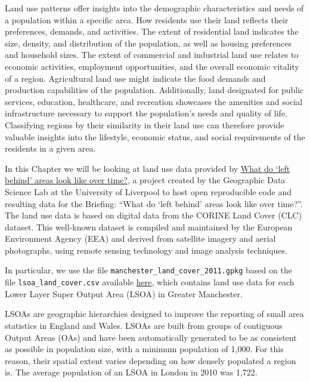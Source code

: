 \documentclass[
  letterpaper,
  DIV=11,
  numbers=noendperiod]{scrreprt}
\begin{document}
Land use patterns offer insights into the demographic characteristics
and needs of a population within a specific area. How residents use
their land reflects their preferences, demands, and activities. The
extent of residential land indicates the size, density, and distribution
of the population, as well as housing preferences and household sizes.
The extent of commercial and industrial land use relates to economic
activities, employment opportunities, and the overall economic vitality
of a region. Agricultural land use might indicate the food demands and
production capabilities of the population. Additionally, land designated
for public services, education, healthcare, and recreation showcases the
amenities and social infrastructure necessary to support the
population's needs and quality of life. Classifying regions by their
similarity in their land use can therefore provide valuable insights
into the lifestyle, economic status, and social requirements of the
residents in a given area.

In this Chapter we will be looking at land use data provided by
\href{https://github.com/GDSL-UL/APPG-LBA/blob/main/README.md}{What do
`left behind' areas look like over time?}, a project created by the
Geographic Data Science Lab at the University of Liverpool to host open
reproducible code and resulting data for the Briefing: ``What do `left
behind' areas look like over time?''. The land use data is based on
digital data from the CORINE Land Cover (CLC) dataset. This well-known
dataset is compiled and maintained by the European Environment Agency
(EEA) and derived from satellite imagery and aerial photographs, using
remote sensing technology and image analysis techniques.

In particular, we use the file
\texttt{manchester\_land\_cover\_2011.gpkg} based on the file
\texttt{lsoa\_land\_cover.csv} available
\href{https://github.com/GDSL-UL/APPG-LBA/blob/main/data/lsoa_land_cover.csv}{here},
which contains land use data for each Lower Layer Super Output Area
(LSOA) in Greater Manchester.

LSOAs are geographic hierarchies designed to improve the reporting of
small area statistics in England and Wales. LSOAs are built from groups
of contiguous Output Areas (OAs) and have been automatically generated
to be as consistent as possible in population size, with a minimum
population of 1,000. For this reason, their spatial extent varies
depending on how densely populated a region is. The average population
of an LSOA in London in 2010 was 1,722.
\end{document}
